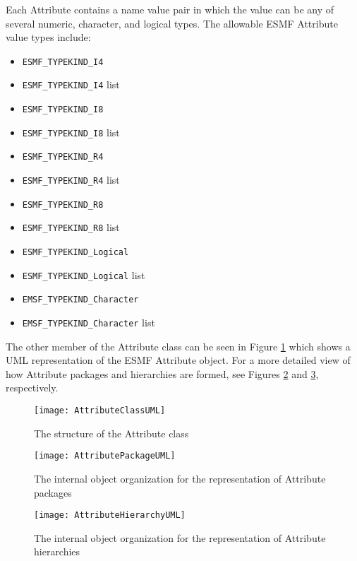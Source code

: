 %

Each Attribute contains a name value pair in which the value can be any of several numeric, character, and logical types.  The allowable ESMF Attribute value types include:

\begin{itemize}
\item {\tt ESMF\_TYPEKIND\_I4}
\item {\tt ESMF\_TYPEKIND\_I4} list
\item {\tt ESMF\_TYPEKIND\_I8}
\item {\tt ESMF\_TYPEKIND\_I8} list
\item {\tt ESMF\_TYPEKIND\_R4}
\item {\tt ESMF\_TYPEKIND\_R4} list
\item {\tt ESMF\_TYPEKIND\_R8}
\item {\tt ESMF\_TYPEKIND\_R8} list
\item {\tt ESMF\_TYPEKIND\_Logical}
\item {\tt ESMF\_TYPEKIND\_Logical} list
\item {\tt EMSF\_TYPEKIND\_Character}
\item {\tt EMSF\_TYPEKIND\_Character} list
\end{itemize}

The other member of the Attribute class can be seen in Figure \ref{fig:AttributeClassUML}  which shows a UML representation of the ESMF Attribute object.   For a more detailed view of how Attribute packages and hierarchies are formed, see Figures \ref{fig:AttributePackageUML} and \ref{fig:AttributeHierarchyUML}, respectively.

\begin{figure}[h]
\centering
\texttt{[image: AttributeClassUML]}
\caption{The structure of the Attribute class}
\label{fig:AttributeClassUML}
\end{figure}
\clearpage

\begin{figure}[h]
\centering
\texttt{[image: AttributePackageUML]}
\caption{The internal object organization for the representation of Attribute packages}
\label{fig:AttributePackageUML}
\end{figure}
\clearpage

\begin{figure}[h]
\centering
\texttt{[image: AttributeHierarchyUML]}
\caption{The internal object organization for the representation of Attribute hierarchies}
\label{fig:AttributeHierarchyUML}
\end{figure}
\clearpage